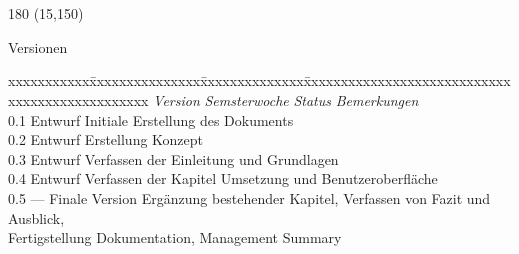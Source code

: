 \chapter*{}
\label{chap:versionen}

\begin{textblock}{180} (15,150)
\color{black}
\begin{huge}
Versionen
\end{huge}
\vspace{10mm}

\fontsize{10pt}{18pt}\selectfont
\begin{tabbing}
xxxxxxxxxxx\=xxxxxxxxxxxxxxx\=xxxxxxxxxxxxxx\=xxxxxxxxxxxxxxxxxxxxxxxxxxxxxxxxxxxxxxxxxxxxxxx \kill
\textit{Version}	\> \textit{Semsterwoche}	\> \textit{Status}		\> \textit{Bemerkungen}\\
0.1		\> Entwurf			\> Initiale Erstellung des Dokuments\\
0.2		\> Entwurf			\> Erstellung Konzept\\
0.3		\> Entwurf			\> Verfassen der Einleitung und Grundlagen\\
0.4		\> Entwurf			\> Verfassen der Kapitel Umsetzung und Benutzeroberfläche\\
0.5	\> ---	\> Finale Version	\> Ergänzung bestehender Kapitel, Verfassen von Fazit und Ausblick,\\
	\>		\>					\> Fertigstellung Dokumentation, Management Summary
\end{tabbing}

\end{textblock}

